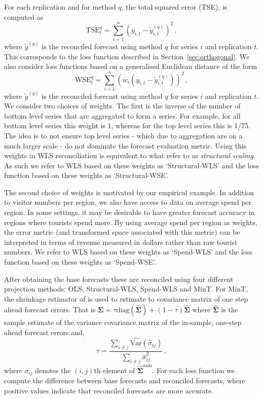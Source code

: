 \documentclass[12pt]{article}
\def\var{\text{Var}}
\theoremstyle{definition}
\begin{document}
{\color{blue} For each replication and for method $q$, the total squared error (TSE), is computed as
	\begin{equation}
	\label{eq:tse}
	\textrm{TSE}^{q}_t=\sum\limits_{i=1}^n(y_{i,t}-\tilde{y}^{(q)}_{i,t})^2\,,
	\end{equation}
	where $\tilde{y}^{(q)}$ is the reconciled forecast using method $q$ for series $i$ and replication $t$.
This corresponds to the loss function described in Section~\ref{sec:orthogonal}. We also consider loss functions based on a generalised Euclidean distance of the form
\begin{equation*}
	\textrm{WSE}^{q}_t=\sum\limits_{i=1}^n \left(w_i (y_{i,t}-\tilde{y}^{(q)}_{i,t})\right)^2\,,
	\end{equation*}
	where $\tilde{y}^{(q)}$ is the reconciled forecast using method $q$ for series $i$ and replication $t$.  We consider two choices of weights.  The first is the inverse of the number of bottom level series that are aggregated to form a series.  For example, for all bottom level series this weight is 1, whereas for the top level series this is 1/75.  The idea is to not ensure top level series - which due to aggregation are on a much larger scale -  do not dominate the forecast evaluation metric.  Using this weights in WLS reconciliation is equivalent to what \cite{AthEtAl2017} refer to as \textit{structural scaling}.  As such we refer to WLS based on these weights as `Structural-WLS' and the loss function based on these weights as `Structural-WSE'.  
	
	The second choice of weights is motivated by our empirical example.  In addition to visitor numbers per region, we also have access to data on average spend per region.  In some settings, it may be desirable to have greater forecast accuracy in regions where tourists spend more.  By using average spend per region as weights, the error metric (and transformed space associated with this metric) can be interpreted in terms of revenue measured in dollars rather than raw tourist numbers. We refer to WLS based on these weights as `Spend-WLS' and the loss function based on these weights as `Spend-WSE'.
}

After obtaining the base forecasts these are reconciled using four different projection methods: OLS,{\color{blue} Structural-WLS, Spend-WLS  and MinT.   For MinT, the shrinkage estimator of \cite{Schafer2005} is used to estimate to covariance matrix of one step ahead forecast errors.  That is $\bm{\Sigma} = \tau\text{diag}(\hat{\bm{\Sigma}}) + (1-\tau)\hat{\bm{\Sigma}}$  where $\hat{\bm{\Sigma}}$ is the sample estimate of the variance covariance matrix of the in-sample, one-step ahead forecast errors and,
	\begin{equation*}
	\tau = \frac{\sum_{i \neq j}\hat{\var}(\hat{\sigma}_{ij})}{\sum_{i \neq j}{\hat{\sigma}}^2_{ij}}\,,
	\end{equation*}
	where $\sigma_{ij}$ denotes the $(i,j)$th element of $\hat{\bm{\Sigma}}^{\text{sam}}$.  For each loss function} we compute the difference between base forecasts and reconciled forecasts, where positive values indicate that reconciled forecasts are more accurate. 
\end{document}
